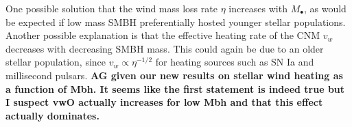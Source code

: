\documentclass[usenatbib,fleqn]{mn2e}
\newcommand{\Mdot}{\dot{M}}
\newcommand{\eddr}{\dot{M}/\dot{M}_{\rm Edd}}
\newcommand{\Mbh}[1][]{M_{\bullet#1}}
\newcommand{\vwO}{v_{w}}
\begin{document}


One possible solution that the wind mass loss rate $\eta$ increases
with $\Mbh$, as would be expected if low mass SMBH preferentially
hosted younger stellar populations.  Another possible explanation is
that the effective heating rate of the CNM $v_{w}$ decreases
with decreasing SMBH mass.  This could again be due to an older
stellar population, since $v_{w} \propto \eta^{-1/2}$ for heating
sources such as SN Ia and millisecond pulsars.
{\bf AG given our new results on stellar wind heating as a function of
Mbh. It seems like the first statement is indeed true but I suspect
vwO actually increases for low Mbh and that this effect actually dominates.}
\end{document}
